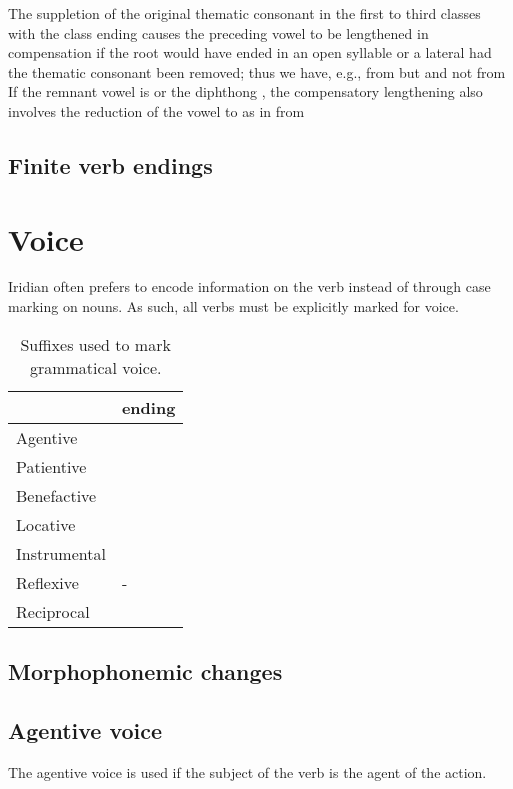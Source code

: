 The suppletion of the original thematic consonant in the first to third classes with the class ending causes the preceding vowel to be lengthened in compensation if the root would have ended in an open syllable or a lateral had the thematic consonant been removed; thus we have, e.g.,  from  but  and not  from  If the remnant vowel is  or the diphthong , the compensatory lengthening also involves the reduction of the vowel to  as in  from 

\subsection{Finite verb endings}

\section{Voice}

Iridian often prefers to encode information on the verb instead of through case marking on nouns. As such, all verbs must be explicitly marked for voice.
\begin{table}[!ht]
	\small
	\caption{Suffixes used to mark grammatical voice.}\medskip
	\begin{tabu} to 0.5\textwidth{YY[0.5]}
		\toprule
		&{\sc ending}\\
		\midrule
		Agentive	& \\
		Patientive	& \\ 
		Benefactive	& \\ 
		Locative	& \\ 
		Instrumental& \\ 
		Reflexive	& -\\ 
		Reciprocal	& \\ 
		\bottomrule
	\end{tabu}
\end{table}

\subsection{Morphophonemic changes}


\subsection{Agentive voice}
\par The agentive voice is used if the subject of the verb is the agent of the action.

